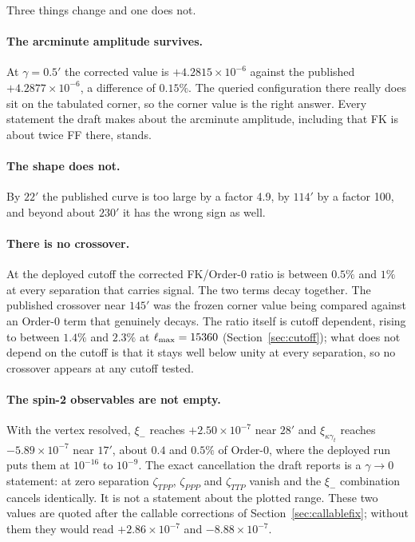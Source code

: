 Three things change and one does not.

\paragraph{The arcminute amplitude survives.} At $\gamma=0.5'$ the
corrected value is $+4.2815\times10^{-6}$ against the published
$+4.2877\times10^{-6}$, a difference of $0.15\%$. The queried configuration
there really does sit on the tabulated corner, so the corner value is the
right answer. Every statement the draft makes about the arcminute
amplitude, including that FK is about twice FF there, stands.

\paragraph{The shape does not.} By $22'$ the published curve is too large
by a factor 4.9, by $114'$ by a factor 100, and beyond about $230'$ it has
the wrong sign as well.

\paragraph{There is no crossover.} At the deployed cutoff the corrected
FK/Order-0 ratio is between $0.5\%$ and $1\%$ at every separation that
carries signal. The two terms decay together. The published crossover near
$145'$ was the frozen corner value being compared against an Order-0 term
that genuinely decays. The ratio itself is cutoff dependent, rising to
between $1.4\%$ and $2.3\%$ at $\ell_{\max}=15360$
(Section~\ref{sec:cutoff}); what does not depend on the cutoff is that it
stays well below unity at every separation, so no crossover appears at any
cutoff tested.

\paragraph{The spin-2 observables are not empty.} With the vertex resolved,
$\xi_-$ reaches $+2.50\times10^{-7}$ near $28'$ and $\xi_{\kappa\gamma_t}$
reaches $-5.89\times10^{-7}$ near $17'$, about $0.4$ and $0.5\%$ of
Order-0, where the deployed run puts them at $10^{-16}$ to $10^{-9}$. The
exact cancellation the draft reports is a $\gamma\to0$ statement: at zero
separation $\zeta_{TPP}$, $\zeta_{PPP}$ and $\zeta_{TTP}$ vanish and the
$\xi_-$ combination cancels identically. It is not a statement about the
plotted range. These two values are quoted after the callable corrections
of Section~\ref{sec:callablefix}; without them they would read
$+2.86\times10^{-7}$ and $-8.88\times10^{-7}$.

